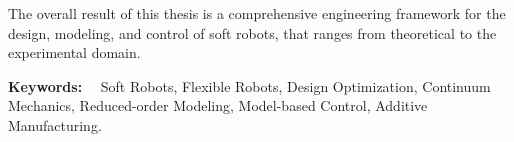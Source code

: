 
The overall result of this thesis is a comprehensive engineering framework for the design, modeling, and control of soft robots, that ranges from theoretical to the experimental domain.

\vspace*{5pt}\noindent
\textbf{Keywords:} \ \ Soft Robots, Flexible Robots, Design Optimization, Continuum Mechanics, Reduced-order Modeling, Model-based Control, Additive Manufacturing.

